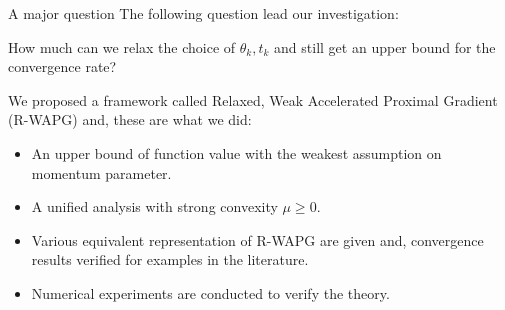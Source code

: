 \documentclass[11pt]{beamer}
\theoremstyle{definition}
\begin{document}
    \begin{frame}{A major question}
        The following question lead our investigation: 
        \begin{tcolorbox}
            How much can we relax the choice of $\theta_k, t_k$ and still get an upper bound for the convergence rate? 
        \end{tcolorbox}
        We proposed a framework called Relaxed, Weak Accelerated Proximal Gradient (R-WAPG) and, these are what we did: 
        \begin{itemize}
            \item An upper bound of function value with the weakest assumption on momentum parameter.
            \item A unified analysis with strong convexity $\mu \ge 0$. 
            \item Various equivalent representation of R-WAPG are given and, convergence results verified for examples in the literature. 
            \item Numerical experiments are conducted to verify the theory. 
        \end{itemize}
    \end{frame}
\end{document}
